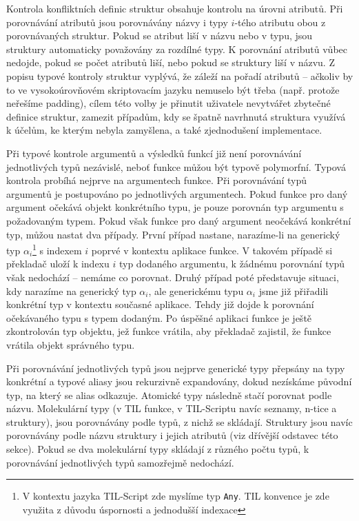 Kontrola konfliktních definic struktur obsahuje kontrolu na úrovni atributů. Při porovnávání
atributů jsou porovnávány názvy i typy $i$-tého atributu obou z porovnávaných struktur. Pokud se
atribut liší v názvu nebo v typu, jsou struktury automaticky považovány za rozdílné typy.
K porovnání atributů vůbec nedojde, pokud se počet atributů liší, nebo pokud se struktury liší
v názvu. Z popisu typové kontroly struktur vyplývá, že záleží na pořadí atributů -- ačkoliv by to
ve vysokoúrovňovém skriptovacím jazyku nemuselo být třeba (např. protože neřešíme padding), cílem
této volby je přinutit uživatele nevytvářet zbytečné definice struktur, zamezit případům, kdy
se špatně navrhnutá struktura využívá k účelům, ke kterým nebyla zamyšlena, a také zjednodušení
implementace.

Při typové kontrole argumentů a výsledků funkcí již není porovnávání jednotlivých typů nezávislé,
neboť funkce můžou být typově polymorfní. Typová kontrola probíhá nejprve na argumentech funkce.
Při porovnávání typů argumentů je postupováno po jednotlivých argumentech. Pokud funkce pro daný
argument očekává objekt konkrétního typu, je pouze porovnán typ argumentu s požadovaným typem.
Pokud však funkce pro daný argument neočekává konkrétní typ, můžou nastat dva případy. První případ
nastane, narazíme-li na generický typ $\alpha_{i}$\footnote{V kontextu jazyka TIL-Script zde myslíme typ
  \lstinline{Any}. TIL konvence je zde využita z důvodu úspornosti a jednodušší
  indexace} s indexem $i$ poprvé v kontextu aplikace funkce. V takovém případě si překladač uloží
k indexu $i$ typ dodaného argumentu, k žádnému porovnání typů však nedochází -- nemáme co porovnat.
Druhý případ poté představuje situaci, kdy narazíme na generický typ $\alpha_{i}$, ale generickému typu
$\alpha_{i}$ jsme již přiřadili konkrétní typ v kontextu současné aplikace. Tehdy již dojde k porovnání
očekávaného typu s typem dodaným. Po úspěšné aplikaci funkce je ještě zkontrolován typ objektu, jež
funkce vrátila, aby překladač zajistil, že funkce vrátila objekt správného typu.

Při porovnávání jednotlivých typů jsou nejprve generické typy přepsány na typy konkrétní a typové
aliasy jsou rekurzivně expandovány, dokud nezískáme původní typ, na který se alias odkazuje.
Atomické typy následně stačí porovnat podle názvu. Molekulární typy (v TIL funkce, v TIL-Scriptu
navíc seznamy, n-tice a struktury), jsou porovnávány podle typů, z nichž se skládají. Struktury
jsou navíc porovnávány podle názvu struktury i jejich atributů (viz dřívější odstavec této sekce).
Pokud se dva molekulární typy skládají z různého počtu typů, k porovnávání jednotlivých typů
samozřejmě nedochází.

